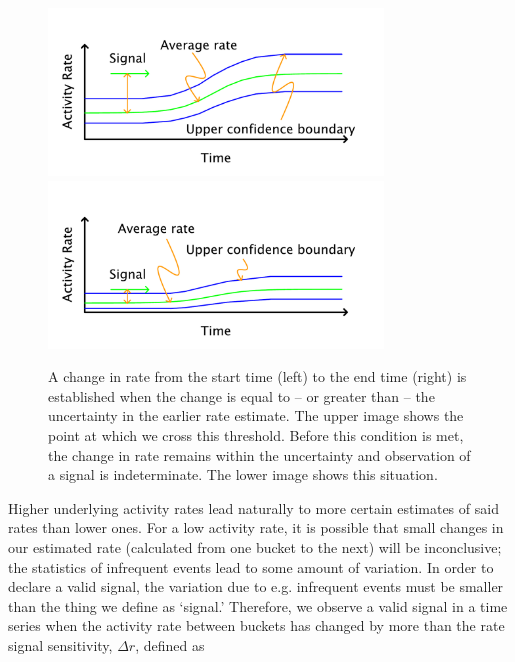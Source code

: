 \documentclass{article}
\begin{document}
%
\begin{figure}[h]
    \centering
    \includegraphics[width=3.5in]{./imgs/fig3a.pdf}
    \includegraphics[width=3.5in]{./imgs/fig3b.pdf}
        \caption{A change in rate from the start time (left) to the end time (right) is established when the 
		change is equal to -- or greater than -- the uncertainty in the earlier rate estimate. The upper 
		image shows the point at which we cross this threshold. Before this condition is met, the 
		change in rate remains within the uncertainty and observation of a signal is 
		indeterminate. The lower image shows this situation.}
    \label{fig:signal}
\end{figure}
%
%

Higher
\reversemarginpar\marginpar{\raggedleft
%
    \begin{tikzpicture}[scale=0.26]]
\draw [red, very thick, rotate around={60: (1.5, 2.598076211353316)}] (0.8, 1.898076211353316) rectangle(2.2, 3.298076211353316);
%
\draw [very thick, <->] (0.25000000000000006, 0.4330127018922193) -- (1.25, 2.165063509461097) ;
\draw [very thick, <->] (1.75, 2.165063509461097) -- (2.75, 0.4330127018922193) ;
\draw [very thick, <->] (2.5, 0) -- (0.5, 0) ;
%
\draw [orange, ultra thick] (0,0) circle [radius= 0.5 ];
\draw [yellow, ultra thick] ( 1.5 , 2.59807621135 ) circle [radius= 0.5 ];
\draw [green,  ultra thick] ( 3.0 , 0 ) circle [radius= 0.5 ];
    \end{tikzpicture}
%
%
}
underlying activity rates lead naturally to more certain estimates of said rates than lower ones. 
For a low activity rate, it is possible that small changes in our estimated rate 
(calculated from one bucket to the next) will be inconclusive; the statistics of infrequent events 
lead to some amount of variation. In order to declare a valid signal, the variation due to e.g. 
infrequent events must be smaller than the thing we define as `signal.' Therefore, we observe
a valid signal in a time series when the activity rate between buckets has changed by 
more than the rate signal sensitivity, $\Delta r$, defined as
\end{document}
